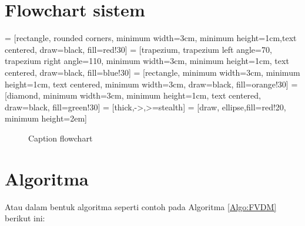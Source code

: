 \documentclass[a4paper,12pt,oneside]{book}
\begin{document}
\section{Flowchart sistem}

 = [rectangle, rounded corners, minimum width=3cm, minimum height=1cm,text centered, draw=black, fill=red!30]
 = [trapezium, trapezium left angle=70, trapezium right angle=110, minimum width=3cm, minimum height=1cm, text centered, draw=black, fill=blue!30]
 = [rectangle, minimum width=3cm, minimum height=1cm, text centered, minimum width=3cm, draw=black, fill=orange!30]
 = [diamond, minimum width=3cm, minimum height=1cm, text centered, draw=black, fill=green!30]
 = [thick,->,>=stealth]
 = [draw, ellipse,fill=red!20,
    minimum height=2em]

\begin{figure}[h!]
    \centering
    \caption{Caption flowchart}
    \label{figflow}
\end{figure}

\section{Algoritma}
 Atau dalam bentuk algoritma seperti contoh pada Algoritma \ref{Algo:FVDM} berikut ini:
 
\end{document}
